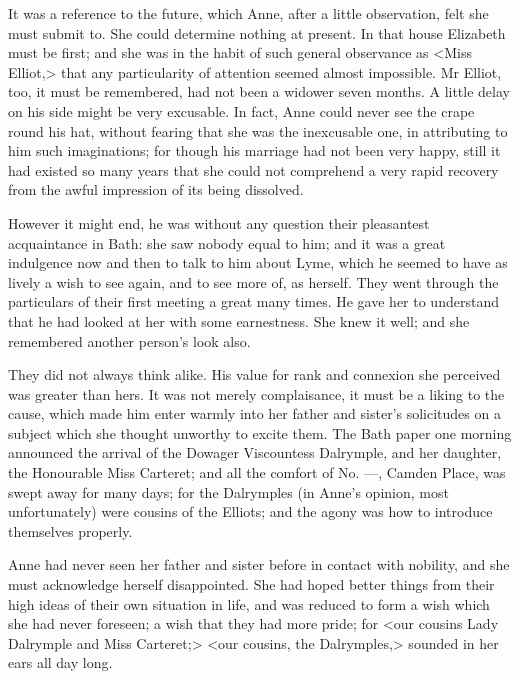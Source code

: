It was a reference to the future, which Anne, after a little observation, felt she must submit to. She could determine nothing at present. In that house Elizabeth must be first; and she was in the habit of such general observance as <Miss Elliot,> that any particularity of attention seemed almost impossible. Mr Elliot, too, it must be remembered, had not been a widower seven months. A little delay on his side might be very excusable. In fact, Anne could never see the crape round his hat, without fearing that she was the inexcusable one, in attributing to him such imaginations; for though his marriage had not been very happy, still it had existed so many years that she could not comprehend a very rapid recovery from the awful impression of its being dissolved.

However it might end, he was without any question their pleasantest acquaintance in Bath: she saw nobody equal to him; and it was a great indulgence now and then to talk to him about Lyme, which he seemed to have as lively a wish to see again, and to see more of, as herself. They went through the particulars of their first meeting a great many times. He gave her to understand that he had looked at her with some earnestness. She knew it well; and she remembered another person's look also.

They did not always think alike. His value for rank and connexion she perceived was greater than hers. It was not merely complaisance, it must be a liking to the cause, which made him enter warmly into her father and sister's solicitudes on a subject which she thought unworthy to excite them. The Bath paper one morning announced the arrival of the Dowager Viscountess Dalrymple, and her daughter, the Honourable Miss Carteret; and all the comfort of No. —, Camden Place, was swept away for many days; for the Dalrymples (in Anne's opinion, most unfortunately) were cousins of the Elliots; and the agony was how to introduce themselves properly.

Anne had never seen her father and sister before in contact with nobility, and she must acknowledge herself disappointed. She had hoped better things from their high ideas of their own situation in life, and was reduced to form a wish which she had never foreseen; a wish that they had more pride; for <our cousins Lady Dalrymple and Miss Carteret;> <our cousins, the Dalrymples,> sounded in her ears all day long.

